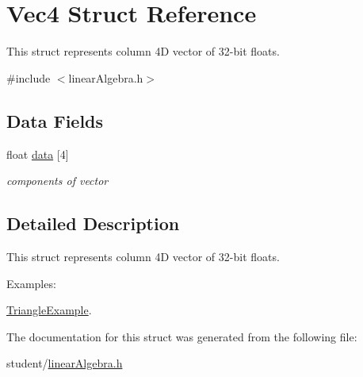 \hypertarget{structVec4}{\section{Vec4 Struct Reference}
\label{structVec4}
}


This struct represents column 4\-D vector of 32-\/bit floats.  




{\ttfamily \#include $<$linear\-Algebra.\-h$>$}

\subsection*{Data Fields}
\begin{DoxyCompactItemize}
\item 
\hypertarget{structVec4_aee1e79a1c063cba1c01227258a5e1d9f}{float \hyperlink{structVec4_aee1e79a1c063cba1c01227258a5e1d9f}{data} \mbox{[}4\mbox{]}}\label{structVec4_aee1e79a1c063cba1c01227258a5e1d9f}

\begin{DoxyCompactList}\small\item\em components of vector \end{DoxyCompactList}\end{DoxyCompactItemize}


\subsection{Detailed Description}
This struct represents column 4\-D vector of 32-\/bit floats. \begin{Desc}
\item[Examples\-: ]\par
\hyperlink{TriangleExample-example}{Triangle\-Example}.\end{Desc}


The documentation for this struct was generated from the following file\-:\begin{DoxyCompactItemize}
\item 
student/\hyperlink{linearAlgebra_8h}{linear\-Algebra.\-h}\end{DoxyCompactItemize}
